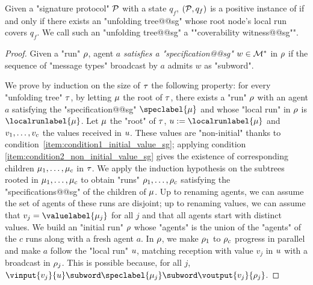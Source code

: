 \begin{lemma}
\label{lem:coverability_witness_sg}
Given a "signature protocol" $\mathcal{P}$ with a state $q_f$, $(\mathcal{P},q_f)$ is a positive instance of \COVER if and only if there exists an "unfolding tree@@sg" whose root node's local run covers $q_f$. We call such an "unfolding tree@@sg" a ""coverability witness@@sg"".
\end{lemma}
\begin{proof}
Given a "run" $\rho$, agent $a$ \emph{satisfies a "specification@@sg"} $w \in \mathcal{M}^*$ in $\rho$ if the sequence of "message types" broadcast by $a$ admits $w$ as "subword".%

We prove by induction on the size of $\tau$ the following property: for every "unfolding tree" $\tau$, by letting $\mu$ the root of $\tau$, there exists a "run" $\rho$ with an agent $a$ satisfying the "specification@@sg" $\speclabel{\node}$ and whose "local run" in $\rho$ is $\localrunlabel{\node}$. Let $\mu$ the "root" of $\tau$, $\localrun := \localrunlabel{\node}$ and $v_1, \dots, v_c$ the values received in $u$. These values are "non-initial" thanks to condition~\ref{item:condition1_initial_value_sg}; applying condition \ref{item:condition2_non_initial_value_sg} gives the existence of corresponding children $\mu_1, \dots, \mu_c$ in $\tau$. We apply the induction hypothesis on the subtrees rooted in $\mu_1, \dots, \mu_c$ to obtain "runs" $\rho_1, \dots, \rho_c$ satisfying the "specifications@@sg" of the children of $\mu$. Up to renaming agents, we can assume the set of agents of these runs are disjoint; up to renaming values, we can assume that $\aval_j = \valuelabel{\node_j}$ for all $j$ and that all agents start with distinct values. We build an "initial run" $\rho$ whose "agents" is the union of the "agents" of the $c$ runs along with a fresh agent $a$. In $\rho$, we make $\rho_1$ to $\rho_c$ progress in parallel and make $a$ follow the "local run" $u$, matching reception with value $v_j$ in $u$ with a broadcast in $\rho_j$. This is possible because, for all $j$, $\vinput{v_j}{\localrun} \subword \speclabel{\node_j} \subword \voutput{v_j}{\run_j}$. 


\end{proof}
